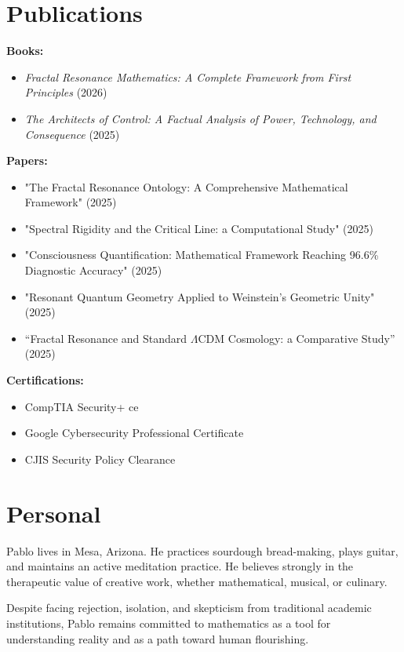\section*{Publications}

\textbf{Books:}
\begin{itemize}
\item \textit{Fractal Resonance Mathematics: A Complete Framework from First Principles} (2026)
\item \textit{The Architects of Control: A Factual Analysis of Power, Technology, and Consequence} (2025)
\end{itemize}

\textbf{Papers:}
\begin{itemize}
\item "The Fractal Resonance Ontology: A Comprehensive Mathematical Framework" (2025)
\item "Spectral Rigidity and the Critical Line: a Computational Study" (2025)
\item "Consciousness Quantification: Mathematical Framework Reaching 96.6\% Diagnostic Accuracy" (2025)
\item "Resonant Quantum Geometry Applied to Weinstein's Geometric Unity" (2025)
\item ``Fractal Resonance and Standard $\Lambda$CDM Cosmology: a Comparative Study'' (2025)
\end{itemize}

\textbf{Certifications:}
\begin{itemize}
\item CompTIA Security+ ce
\item Google Cybersecurity Professional Certificate
\item CJIS Security Policy Clearance
\end{itemize}

\section*{Personal}

Pablo lives in Mesa, Arizona. He practices sourdough bread-making, plays guitar, and maintains an active meditation practice. He believes strongly in the therapeutic value of creative work, whether mathematical, musical, or culinary.

Despite facing rejection, isolation, and skepticism from traditional academic institutions, Pablo remains committed to mathematics as a tool for understanding reality and as a path toward human flourishing.

